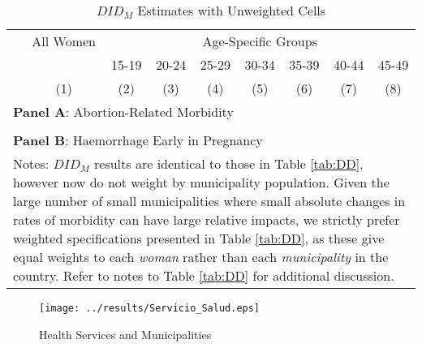 \documentclass[12pt]{article}
\begin{document}
\begin{landscape}
  \begin{table}[htpb!]
    \centering
    \caption{$DID_M$ Estimates with Unweighted Cells}
    \label{tab:DDUW}
    \begin{tabular}{lcccccccc}\toprule
      &All Women&\multicolumn{7}{c}{Age-Specific Groups} \\ \cmidrule(r){3-9}
      &&15-19&20-24&25-29&30-34&35-39&40-44&45-49 \\
      &(1)&(2)&(3)&(4)&(5)&(6)&(7)&(8) \\ \midrule
      \multicolumn{9}{l}{\textbf{Panel A}: Abortion-Related Morbidity} \\
       \\
      \multicolumn{9}{l}{\textbf{Panel B}: Haemorrhage Early in Pregnancy} \\
       
      \bottomrule
      \multicolumn{9}{p{19.8cm}}{{\footnotesize Notes: $DID_M$ results are identical to those in Table \ref{tab:DD}, however now do not weight by municipality population.  Given the large number of small municipalities where small absolute changes in rates of morbidity can have large relative impacts, we strictly prefer weighted specifications presented in Table \ref{tab:DD}, as these give equal weights to each \emph{woman} rather than each \emph{municipality} in the country.  Refer to notes to Table \ref{tab:DD} for additional discussion.}}
    \end{tabular}
  \end{table}
\end{landscape}

\clearpage
\thispagestyle{empty}
\begin{figure}[htpb!]
  \begin{center}
    \caption{Health Services and Municipalities}
    \label{fig:healthServices}
    \texttt{[image: ../results/Servicio\_Salud.eps]}
  \end{center}
  \vspace{-6mm}
\end{figure}
\clearpage
\end{document}
